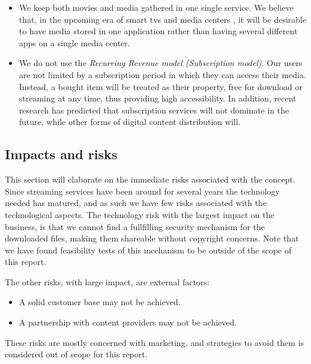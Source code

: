 \begin{itemize}
    \item We keep both movies and media gathered in one single service. We believe that, 
        in the upcoming era of smart tvs and media centers \cite{smarttv}, it will be
        desirable to have media stored in one application rather than having several
        different apps on a single media center.
    \item We do not use the \emph{Recurring Revenue model (Subscription
	model)}\cite{businessmodel}. Our users are not limited by a
	subscription period in which they can access their media. Instead,
	a bought item will be treated as their property, free for download
	or streaming at any time, thus providing high accessibility. In
	addition, recent research\cite{ott} has predicted that subscription
	services will not dominate in the future, while other forms of
	digital content distribution will.
\end{itemize}

\subsection{Impacts and risks}
This section will elaborate on the immediate risks associated with the concept.
Since streaming services have been around for several years the technology
needed has matured, and as such we have few risks associated with the
technological aspects. The technology risk with the largest impact on the
business, is that we cannot find a fullfilling security mechanism for the
downloaded files, making them shareable without copyright concerns. Note that
we have found feasibility tests of this mechanism to be outside of the scope of
this report.

The other risks, with large impact, are external factors:
\begin{itemize}
\item A solid customer base may not be achieved.
\item A partnership with content providers may not be achieved.
\end{itemize}

These risks are mostly concerned with marketing, and strategies to avoid them
is considered out of scope for this report.
